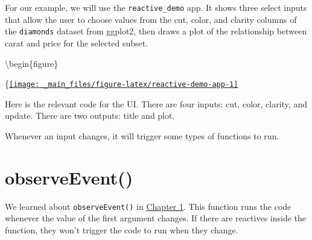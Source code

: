 \documentclass[
]{book}
\newenvironment{Shaded}{\begin{snugshade}}{\end{snugshade}}
\newcommand{\AttributeTok}[1]{\textcolor[rgb]{0.77,0.63,0.00}{#1}}
\newcommand{\ConstantTok}[1]{\textcolor[rgb]{0.00,0.00,0.00}{#1}}
\newcommand{\FunctionTok}[1]{\textcolor[rgb]{0.00,0.00,0.00}{#1}}
\newcommand{\NormalTok}[1]{#1}
\newcommand{\SpecialCharTok}[1]{\textcolor[rgb]{0.00,0.00,0.00}{#1}}
\newcommand{\StringTok}[1]{\textcolor[rgb]{0.31,0.60,0.02}{#1}}
\begin{document}
For our example, we will use the \texttt{reactive\_demo} app. It shows three select inputs that allow the user to choose values from the cut, color, and clarity columns of the \texttt{diamonds} dataset from ggplot2, then draws a plot of the relationship between carat and price for the selected subset.

\textbackslash begin\{figure\}

\{\centering \href{https://shiny.psy.gla.ac.uk/debruine/reactive_demo/}{\texttt{[image: \_main\_files/figure-latex/reactive-demo-app-1]} }

Here is the relevant code for the UI. There are four inputs: cut, color, clarity, and update. There are two outputs: title and plot.

\begin{Shaded}
\end{Shaded}

Whenever an input changes, it will trigger some types of functions to run.

\hypertarget{observeevent-1}{%
\section{observeEvent()}\label{observeevent-1}}

We learned about \texttt{observeEvent()} in \protect\hyperlink{first-reactive}{Chapter 1}. This function runs the code whenever the value of the first argument changes. If there are reactives inside the function, they won't trigger the code to run when they change.
\end{document}
